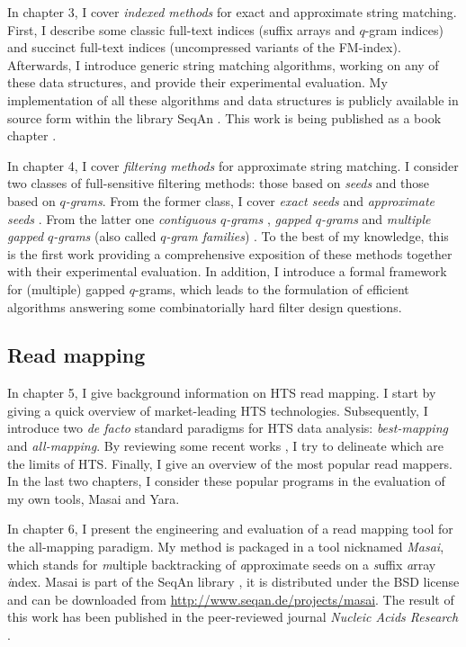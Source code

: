 In chapter 3, I cover \emph{indexed methods} for exact and approximate string matching.
First, I describe some classic full-text indices (suffix arrays and $q$-gram indices) and succinct full-text indices (uncompressed variants of the FM-index).
Afterwards, I introduce generic string matching algorithms, working on any of these data structures, and provide their experimental evaluation.
My implementation of all these algorithms and data structures is publicly available in source form within the \CC library SeqAn \citep{Doering2008}.
This work is being published as a book chapter \citep{Weese2015}.

In chapter 4, I cover \emph{filtering methods} for approximate string matching.
I consider two classes of full-sensitive filtering methods: those based on \emph{seeds} and those based on \emph{$q$-grams}.
From the former class, I cover
\emph{exact seeds} \citep{Baeza1992} and
\emph{approximate seeds} \citep{Myers1994,Navarro2000}.
From the latter one
\emph{contiguous $q$-grams} \citep{Jokinen1991},
\emph{gapped $q$-grams} \citep{Burkhardt2001} and
\emph{multiple gapped $q$-grams} (also called \emph{$q$-gram families}) \citep{Kucherov2005}.
To the best of my knowledge, this is the first work providing a comprehensive exposition of these methods together with their experimental evaluation.
In addition, I introduce a formal framework for (multiple) gapped $q$-grams, which leads to the formulation of efficient algorithms answering some combinatorially hard filter design questions.

\subsection{Read mapping}

In chapter 5, I give background information on HTS read mapping.
I start by giving a quick overview of market-leading HTS technologies.
Subsequently, I introduce two \emph{de facto} standard paradigms for HTS data analysis: \emph{best-mapping} and \emph{all-mapping}.
By reviewing some recent works \citep{Derrien2012,Lee2012}, I try to delineate which are the limits of HTS.
Finally, I give an overview of the most popular read mappers.
In the last two chapters, I consider these popular programs in the evaluation of my own tools, Masai \citep{Siragusa2013} and Yara.

In chapter 6, I present the engineering and evaluation of a read mapping tool for the all-mapping paradigm.
My method is packaged in a \CC tool nicknamed \emph{Masai}, which stands for \emph{m}ultiple backtracking of \emph{a}pproximate seeds on a \emph{s}uffix \emph{a}rray \emph{i}ndex.
Masai is part of the SeqAn library \citep{Doering2008}, it is distributed under the BSD license and can be downloaded from \url{http://www.seqan.de/projects/masai}.
The result of this work has been published in the peer-reviewed journal \emph{Nucleic Acids Research} \citep{Siragusa2013}.

